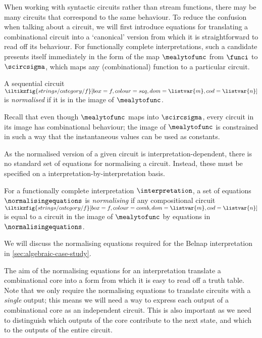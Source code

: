 When working with syntactic circuits rather than stream functions, there may be
many circuits that correspond to the same behaviour.
To reduce the confusion when talking about a circuit, we will first introduce
equations for translating a combinational circuit into a `canonical' version
from which it is straightforward to read off its behaviour.
For functionally complete interpretations, such a candidate presents itself
immediately in the form of the map \(\mealytofunc\) from \(\funci\) to
\(\scircsigma\), which maps any (combinational) function to a particular
circuit.

\begin{definition}
    A sequential circuit \(
        \iltikzfig{strings/category/f}[box=f,colour=seq,dom=\listvar{m},cod=\listvar{n}]
    \) is \emph{normalised} if it is in the image of \(\mealytofunc\).
\end{definition}

\begin{remark}
    Recall that even though \(\mealytofunc\) maps into \(\scircsigma\), every
    circuit in its image has combinational behaviour; the image of
    \(\mealytofunc\) is constrained in such a way that the instantaneous values
    can be used as constants.
\end{remark}

As the normalised version of a given circuit is interpretation-dependent, there
is no standard set of equations for normalising a circuit.
Instead, these must be specified on a interpretation-by-interpretation basis.

\begin{definition}
    For a functionally complete interpretation \(\interpretation\), a set of
    equations \(\normalisingequations\) is \emph{normalising} if any
    compositional circuit \(
        \iltikzfig{strings/category/f}[box=f,colour=comb,dom=\listvar{m},cod=\listvar{n}]
    \) is equal to a circuit in the image of \(\mealytofunc\) by equations in
    \(\normalisingequations\).
\end{definition}

\begin{example}
    We will discuss the normalising equations required for the Belnap
    interpretation in \cref{sec:algebraic-case-study}.
\end{example}

The aim of the normalising equations for an interpretation translate a
combinational core into a form from which it is easy to read off a truth table.
Note that we only require the normalising equations to translate circuits with a
\emph{single} output; this means we will need a way to express each output of
a combinational core as an independent circuit.
This is also important as we need to distinguish which outputs of the core
contribute to the next state, and which to the outputs of the entire circuit.

